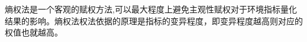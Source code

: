\documentclass[preview]{standalone}
\begin{document}
\begin{center}
熵权法是一个客观的赋权方法,可以最大程度上避免主观性赋权对于环境指标量化结果的影响。熵权法权法依据的原理是指标的变异程度，即变异程度越高则对应的权值也就越高。
\end{center}
\end{document}
